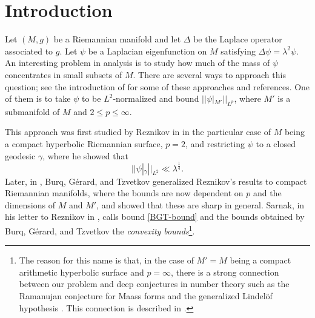 \documentclass[11pt]{amsart}
\theoremstyle{definition}
\theoremstyle{remark}
\begin{document}
\section{Introduction}\label{Introduction}

Let $(M,g)$ be a Riemannian manifold and let $\Delta$ be the Laplace operator associated to $g$. Let $\psi$ be a Laplacian eigenfunction on $M$ satisfying $\Delta \psi = \lambda^2 \psi$. An interesting problem in analysis is to study how much of the mass of $\psi$ concentrates in small subsets of $M$. There are several ways to approach this question; see the introduction of \cite{BGTGeneralBound} for some of these approaches and references. One of them is to take $\psi$ to be $L^2$-normalized and bound $||\psi|_{M'}||_{L^p}$, where $M'$ is a submanifold of $M$ and $2\leq p\leq \infty$. 

This approach was first studied by Reznikov in \cite{ReznikovInitialStudy} in the particular case of $M$ being a compact hyperbolic Riemannian surface, $p=2$, and restricting $\psi$ to a closed geodesic $\gamma$, where he showed that 
\begin{equation}
    ||\psi|_{\gamma}||_{L^2} \ll \lambda^{\frac{1}{4}}. \label{BGT-bound}
\end{equation}
Later, in \cite[Thm. 3]{BGTGeneralBound}, Burq, G\'erard, and Tzvetkov generalized Reznikov's results to compact Riemannian manifolds, where the bounds are now dependent on $p$ and the dimensions of $M$ and $M'$, and showed that these are sharp in general. Sarnak, in his letter to Reznikov in \cite[p. 1]{LetterSarnakReznikov}, calls bound \eqref{BGT-bound} and the bounds obtained by Burq, G\'erard, and Tzvetkov the \textit{convexity bounds}\footnote{The reason for this name is that, in the case of $M'=M$ being a compact arithmetic hyperbolic surface and $p=\infty$, there is a strong connection between our problem and deep conjectures in number theory such as the Ramanujan conjecture for Maass forms \cite[\S 5.1]{IwaniecKowalski} and the generalized Lindel{\"o}f hypothesis \cite[\S 5.2]{IwaniecKowalski}. This connection is described in \cite[\S 4]{SarnakAQC}.}.
\end{document}
